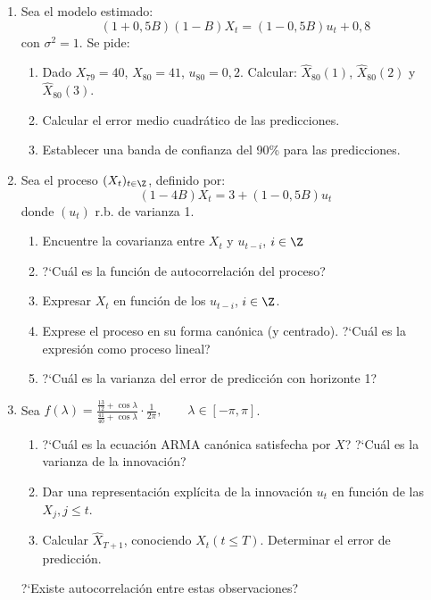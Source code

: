 \begin{enumerate}
\item Sea el modelo estimado:
\[
(1+0,5B)(1-B)X_{t} =(1-0,5B)u_{t} +0,8
\]
con $\sigma^{2}=1.$ Se pide:
\begin{enumerate}
\item Dado $X_{79}= 40$, $X_{80}=41$, $u_{80} =0,2$. Calcular: $\widehat{X}_{80} (1)$, $\widehat{X}_{80} (2)$ y $\widehat{X}_{80} (3)$.
\item Calcular el error medio cuadr\'{a}tico de las predicciones.
\item Establecer una banda de confianza del 90{\%} para las predicciones.
\end{enumerate}

\item Sea el proceso $(X_{t})_{t\in \Z} $, definido por:
\[
(1-4B)X_{t} =3+(1-0,5B)u_{t} 
\]
donde $(u_{t})$ r.b. de varianza 1.

\begin{enumerate}
\item Encuentre la covarianza entre $X_{t}$ y $u_{t-i}$, $i\in \Z$
\item ?`Cu\'{a}l es la funci\'{o}n de autocorrelaci\'{o}n del proceso?
\item Expresar $X_{t}$ en funci\'{o}n de los $u_{t-i}$, $i\in \Z$. 
\item Exprese el proceso en su forma can\'{o}nica (y centrado). ?`Cu\'{a}l es la expresi\'{o}n como proceso lineal?
\item ?`Cu\'{a}l es la varianza del error de predicci\'{o}n con horizonte 1?
\end{enumerate}	

\item Sea $\displaystyle f(\lambda )=\frac{\frac{13}{12}+\cos \lambda }{\frac{41}{40}+\cos \lambda}\cdot\frac{1}{2\pi },\qquad \lambda \in [-\pi ,\pi]$.

\begin{enumerate}
\item ?`Cu\'{a}l es la ecuaci\'{o}n ARMA can\'{o}nica satisfecha por $X$? ?`Cu\'{a}l es la varianza de la innovaci\'{o}n?
\item Dar una representaci\'{o}n expl\'{i}cita de la innovaci\'{o}n $u_{t} $ en funci\'{o}n de las $X_{j} ,j\le t$. 
\item Calcular $\widehat{X}_{T+1} $, conociendo $X_{t} \left( {t\le T} \right)$. Determinar el error de predicci\'{o}n.
\end{enumerate}

?`Existe autocorrelaci\'{o}n entre estas observaciones?


\end{enumerate}
